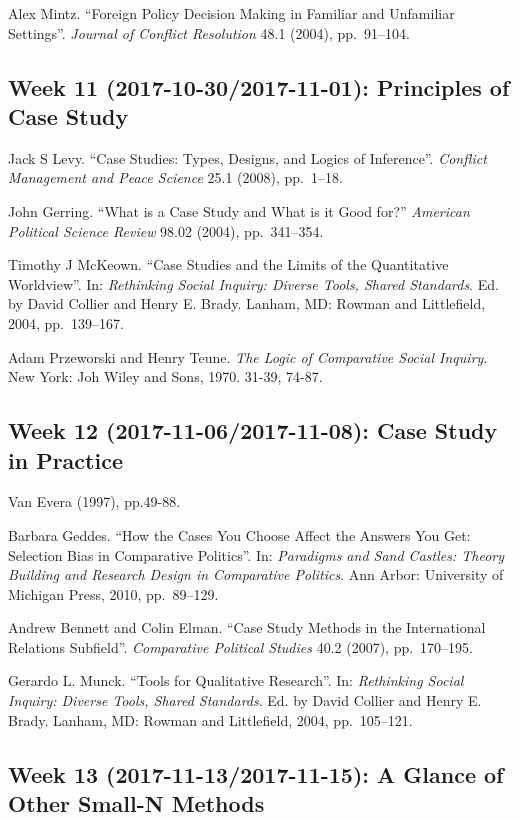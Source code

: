 \documentclass[11pt,]{article}
\theoremstyle{definition}
\theoremstyle{definition}
\theoremstyle{remark}
\begin{document}
Alex Mintz. ``Foreign Policy Decision Making in Familiar and Unfamiliar
Settings''. \emph{Journal of Conflict Resolution} 48.1 (2004),
pp.~91--104.

\subsection{Week 11 (2017-10-30/2017-11-01): Principles of Case
Study}\label{week-11-2017-10-302017-11-01-principles-of-case-study}

Jack S Levy. ``Case Studies: Types, Designs, and Logics of Inference''.
\emph{Conflict Management and Peace Science} 25.1 (2008), pp.~1--18.

John Gerring. ``What is a Case Study and What is it Good for?''
\emph{American Political Science Review} 98.02 (2004), pp.~341--354.

Timothy J McKeown. ``Case Studies and the Limits of the Quantitative
Worldview''. In:
\emph{Rethinking Social Inquiry: Diverse Tools, Shared Standards}. Ed.
by David Collier and Henry E. Brady. Lanham, MD: Rowman and Littlefield,
2004, pp.~139--167.

Adam Przeworski and Henry Teune.
\emph{The Logic of Comparative Social Inquiry}. New York: Joh Wiley and
Sons, 1970. 31-39, 74-87.

\subsection{Week 12 (2017-11-06/2017-11-08): Case Study in
Practice}\label{week-12-2017-11-062017-11-08-case-study-in-practice}

Van Evera (1997), pp.49-88.

Barbara Geddes. ``How the Cases You Choose Affect the Answers You Get:
Selection Bias in Comparative Politics''. In:
\emph{Paradigms and Sand Castles: Theory Building and Research Design in Comparative Politics}.
Ann Arbor: University of Michigan Press, 2010, pp.~89--129.

Andrew Bennett and Colin Elman. ``Case Study Methods in the
International Relations Subfield''. \emph{Comparative Political Studies}
40.2 (2007), pp.~170--195.

Gerardo L. Munck. ``Tools for Qualitative Research''. In:
\emph{Rethinking Social Inquiry: Diverse Tools, Shared Standards}. Ed.
by David Collier and Henry E. Brady. Lanham, MD: Rowman and Littlefield,
2004, pp.~105--121.

\subsection{Week 13 (2017-11-13/2017-11-15): A Glance of Other Small-N
Methods}\label{week-13-2017-11-132017-11-15-a-glance-of-other-small-n-methods}
\end{document}
